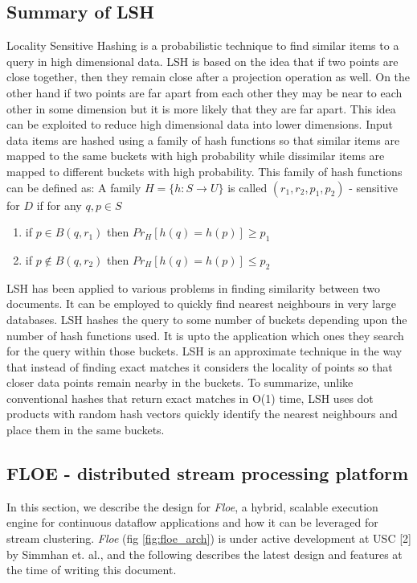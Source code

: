 \documentclass{article} %
\begin{document}
\subsection{Summary of LSH}
\label{sec:LSH}
Locality Sensitive Hashing is a probabilistic technique to find similar items to a query in high dimensional data. LSH is based on the idea that if two points are close together, then they remain close after a projection operation as well. On the other hand if two points are far apart from each other they may be near to each other in some dimension but it is more likely that they are far apart. This idea can be exploited to reduce high dimensional data into lower dimensions. Input data items are hashed using a family of hash functions so that similar items are mapped to the same buckets with high probability while dissimilar items are mapped to different buckets with high probability. This family of hash functions can be defined as: \newline
A family $H = \{h: S \rightarrow U\} $ is called $ (r_1,r_2,p_1,p_2 ) $ - sensitive for $D$ if for any $ q, p \in S$
\begin{enumerate}
\item if $ p \in B(q, r_1) $ then $ Pr_H[h(q)=h(p)] \geq p_1 $
\item if $ p \notin B(q, r_2) $ then $ Pr_H[h(q)=h(p)] \leq p_2 $
\end{enumerate}

LSH has been applied to various problems in finding similarity between two documents. It can be employed to quickly find nearest neighbours in very large databases. LSH hashes the query to some number of buckets depending upon the number of hash functions used. It is upto the application which ones they search for the query within those buckets. LSH is an approximate technique in the way that instead of finding exact matches it considers the locality of points so that closer data points remain nearby in the buckets. To summarize, unlike conventional hashes that return exact matches in O(1) time, LSH uses dot products with random hash vectors quickly identify the nearest neighbours and place them in the same buckets.



\subsection{FLOE - distributed stream processing platform}
\label{sec:floe}
In this section, we describe the design for \textit{Floe}, a hybrid, scalable execution engine for continuous dataflow applications and how it can be leveraged for stream clustering. \textit{Floe} (fig \ref{fig:floe_arch}) is under active development at USC [2] by Simmhan et. al., and the following describes the latest design and features at the time of writing this document. 
\end{document}
